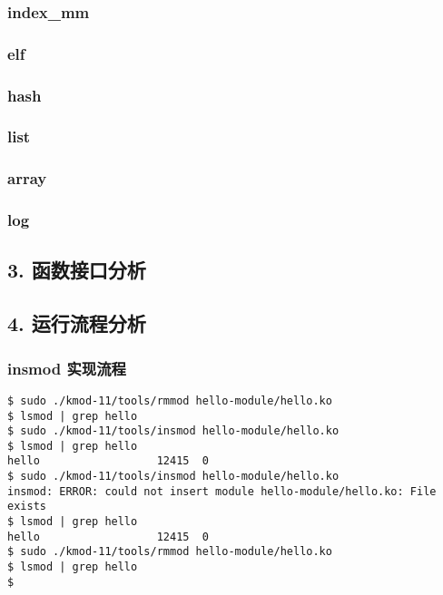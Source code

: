 \documentclass[11pt,a4paper]{article}
\begin{document}
\subsubsection{index\_mm}

\subsubsection{elf}

\subsubsection{hash}

\subsubsection{list}

\subsubsection{array}

\subsubsection{log}

\subsection{3. 函数接口分析}

\subsection{4. 运行流程分析}

\subsubsection{insmod 实现流程}

{\begin{shaded}\begin{verbatim}
$ sudo ./kmod-11/tools/rmmod hello-module/hello.ko 
$ lsmod | grep hello
$ sudo ./kmod-11/tools/insmod hello-module/hello.ko 
$ lsmod | grep hello
hello                  12415  0 
$ sudo ./kmod-11/tools/insmod hello-module/hello.ko 
insmod: ERROR: could not insert module hello-module/hello.ko: File exists
$ lsmod | grep hello
hello                  12415  0 
$ sudo ./kmod-11/tools/rmmod hello-module/hello.ko 
$ lsmod | grep hello
$ 
\end{verbatim}\end{shaded}}
\end{document}
